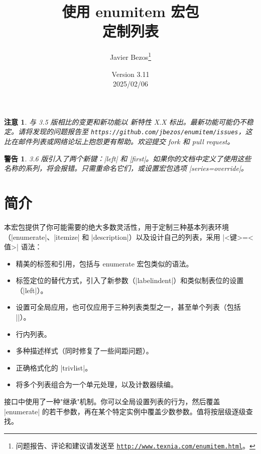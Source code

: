 \documentclass[a4paper]{ltxguide}
\title{使用 \textsf{enumitem} 宏包\\定制列表}
\author{Javier Bezos\footnote{问题报告、评论和建议请发送至 \href{http://www.texnia.com/enumitem.html}%
{\texttt{http://www.texnia.com/enumitem.html}}。}}
\date{Version 3.11\\2025/02/06}
\newtheorem{warning}{警告}
\newtheorem{note}{注意}
\newcommand\New[1]{%
  \colorbox[rgb]{.87, .9, .83}{新特性 #1}\enspace\ignorespaces}
\begin{document}
\maketitle
\tableofcontents

\newpage

\vspace*{1cm}

\begin{note}
  与 3.5 版相比的变更和新功能以 \New{X.X}\hspace{-.5em} 标出。最新功能可能仍不稳定。请将发现的问题报告至
  \texttt{https://github.com/jbezos/enumitem/issues}，这比在邮件列表或网络论坛上抱怨更有帮助。欢迎提交 fork 和 pull request。
\end{note}

\begin{warning}
  3.6 版引入了两个新键：|left| 和 |first|。如果你的文档中定义了使用这些名称的系列，将会报错。只需重命名它们，或设置宏包选项 |series=override|。
\end{warning}

\section{简介}

本宏包提供了你可能需要的绝大多数灵活性，用于定制三种基本列表环境（|enumerate|、|itemize| 和 |description|）以及设计自己的列表，采用 |<键>=<值>| 语法：
\begin{itemize}
\item 精美的标签和引用，包括与 \textsf{enumerate} 宏包类似的语法。

\item 标签定位的替代方式，引入了新参数（|labelindent|）和类似制表位的设置（|left|）。

\item 设置可全局应用，也可仅应用于三种列表类型之一，甚至单个列表（包括 |\topsep|）。

\item 行内列表。

\item 多种描述样式（同时修复了一些间距问题）。

\item 正确格式化的 |trivlist|。

\item 将多个列表组合为一个单元处理，以及计数器续编。

\end{itemize}

接口中使用了一种"继承"机制。你可以全局设置列表的行为，然后覆盖 |enumerate| 的若干参数，再在某个特定实例中覆盖少数参数。值将按层级逐级查找。
\end{document}

